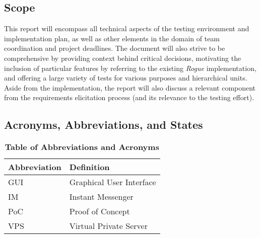 \documentclass[12pt, titlepage]{article}
\begin{document}
	\subsection{Scope}
		This report will encompass all technical aspects of the testing environment and implementation plan, as well as other elements in the domain of team coordination and project deadlines.  The document will also strive to be comprehensive by providing context behind critical decisions, motivating the inclusion of particular features by referring to the existing \textit{Rogue} implementation, and offering a large variety of tests for various purposes and hierarchical units.  Aside from the implementation, the report will also discuss a relevant component from the requirements elicitation process (and its relevance to the testing effort).

	\subsection{Acronyms, Abbreviations, and States}
		
		\begin{table}[H]
			\centering
			\caption{\textbf{Table of Abbreviations and Acronyms}}
			\label{TableAbbreviations}
			\bigskip
			\begin{tabularx}{\textwidth}{p{3cm}X}
				\toprule
				\textbf{Abbreviation} & \textbf{Definition} \\
				\midrule
				GUI & Graphical User Interface\\
				IM & Instant Messenger\\
				PoC & Proof of Concept\\
				VPS & Virtual Private Server\\
				\bottomrule
			\end{tabularx}
		\end{table}
\end{document}

